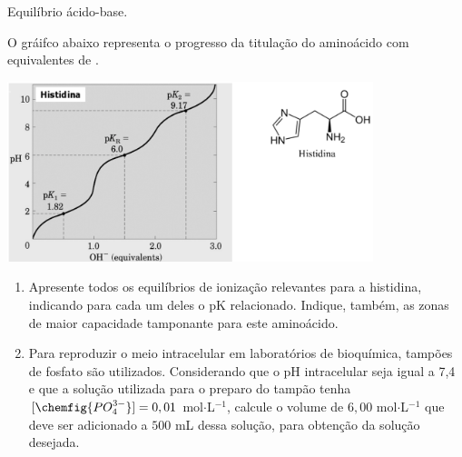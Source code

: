 Equilíbrio ácido-base.

O gráifco abaixo representa o progresso da titulação do aminoácido com equivalentes de .

\begin{center}
	\includegraphics[width = 0.8\textwidth]{figure.png}
\end{center}

\begin{enumerate}[label = (\alph*)]
	\item Apresente todos os equilíbrios de ionização relevantes para a histidina, indicando para cada um deles o pK relacionado.
		Indique, também, as zonas de maior capacidade tamponante para este aminoácido.

	\item Para reproduzir o meio intracelular em laboratórios de bioquímica, tampões de fosfato são utilizados.
		Considerando que o pH intracelular seja igual a 7,4 e que a solução utilizada para o preparo do tampão tenha $[\chemfig{PO_4^{3-}}] = 0,01$ mol$\cdot$L$^{-1}$, calcule o volume de  $6,00$ mol$\cdot$L$^{-1}$ que deve ser adicionado a $500$ mL dessa solução, para obtenção da solução desejada.
\end{enumerate}
